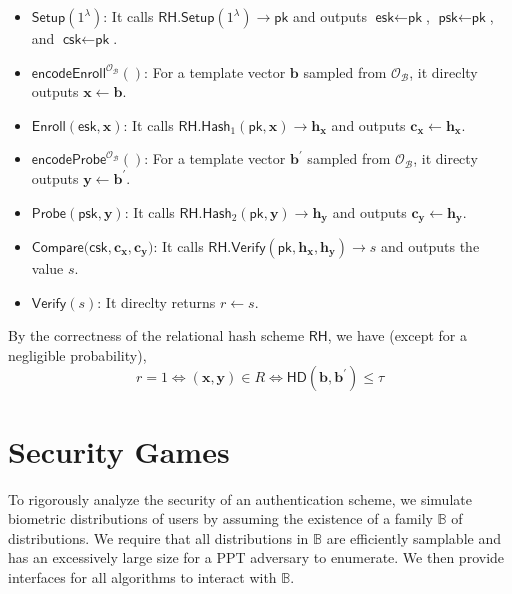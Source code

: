 \begin{itemize}

	\item $\textsf{Setup}(1^\lambda)$: It calls $\textsf{RH.Setup}(1^\lambda) \to \textsf{pk}$ and outputs $\textsf{esk} \gets \textsf{pk}$, $\textsf{psk} \gets \textsf{pk}$, and $\textsf{csk} \gets \textsf{pk}$.

	\item $\textsf{encodeEnroll}^{\mathcal{O}_{\mathcal{B}}}()$: For a template vector $\mathbf{b}$ sampled from $\mathcal{O}_\mathcal{B}$, it direclty outputs $\mathbf{x} \gets \mathbf{b}$.

	\item $\textsf{Enroll}(\textsf{esk}, \mathbf{x})$: It calls $\textsf{RH.Hash}_1(\textsf{pk}, \mathbf{x}) \to \mathbf{h_x}$ and outputs $\mathbf{c_x} \gets \mathbf{h_x}$.

	\item $\textsf{encodeProbe}^{\mathcal{O}_{\mathcal{B}}}()$: For a template vector $\mathbf{b}^\prime$ sampled from $\mathcal{O}_\mathcal{B}$, it directy outputs $\mathbf{y} \gets \mathbf{b}^\prime$.

	\item $\textsf{Probe}(\textsf{psk}, \mathbf{y})$: It calls $\textsf{RH.Hash}_2(\textsf{pk}, \mathbf{y}) \to \mathbf{h_y}$ and outputs $\mathbf{c_y} \gets \mathbf{h_y}$.

	\item $\textsf{Compare}(\textsf{csk}, \mathbf{c_x}, \mathbf{c_y)}$: It calls $\textsf{RH.Verify}(\textsf{pk}, \mathbf{h_x}, \mathbf{h_y}) \to s$ and outputs the value $s$.

	\item $\textsf{Verify}(s)$: It direclty returns $r \gets s$.

\end{itemize}

By the correctness of the relational hash scheme $\textsf{RH}$, we have (except for a negligible probability),
\[
	r = 1 \Leftrightarrow (\mathbf{x}, \mathbf{y}) \in R \Leftrightarrow \textsf{HD}(\mathbf{b}, \mathbf{b}^\prime) \leq \tau
\]




\section{Security Games}
\label{sec:security_game}

To rigorously analyze the security of an authentication scheme, we simulate biometric distributions of users by assuming the existence of a family $\mathbb{B}$ of distributions. We require that all distributions in $\mathbb{B}$ are efficiently samplable and has an excessively large size for a PPT adversary to enumerate. We then provide interfaces for all algorithms to interact with $\mathbb{B}$.

